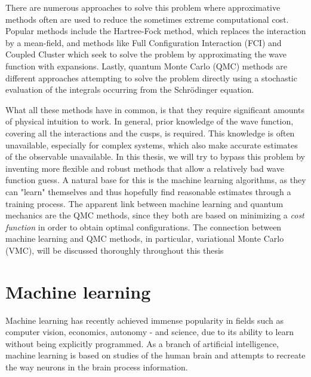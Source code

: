 There are numerous approaches to solve this problem where approximative methods often are used to reduce the sometimes extreme computational cost. Popular methods include the Hartree-Fock method, which replaces the interaction by a mean-field, and methods like Full Configuration Interaction (FCI) and Coupled Cluster which seek to solve the problem by approximating the wave function with expansions. Lastly, quantum Monte Carlo (QMC) methods are different approaches attempting to solve the problem directly using a stochastic evaluation of the integrals occurring from the Schrödinger equation. 

What all these methods have in common, is that they require significant amounts of physical intuition to work. In general, prior knowledge of the wave function, covering all the interactions and the cusps, is required. This knowledge is often unavailable, especially for complex systems, which also make accurate estimates of the observable unavailable. In this thesis, we will try to bypass this problem by inventing more flexible and robust methods that allow a relatively bad wave function guess. A natural base for this is the machine learning algorithms, as they can "learn" themselves and thus hopefully find reasonable estimates through a training process. The apparent link between machine learning and quantum mechanics are the QMC methods, since they both are based on minimizing a \textit{cost function} in order to obtain optimal configurations. The connection between machine learning and QMC methods, in particular, variational Monte Carlo (VMC), will be discussed thoroughly throughout this thesis

\section{Machine learning} \label{sec:machinelearning}
Machine learning has recently achieved immense popularity in fields such as computer vision, economics, autonomy - and science, due to its ability to learn without being explicitly programmed. As a branch of artificial intelligence, machine learning is based on studies of the human brain and attempts to recreate the way neurons in the brain process information. 

